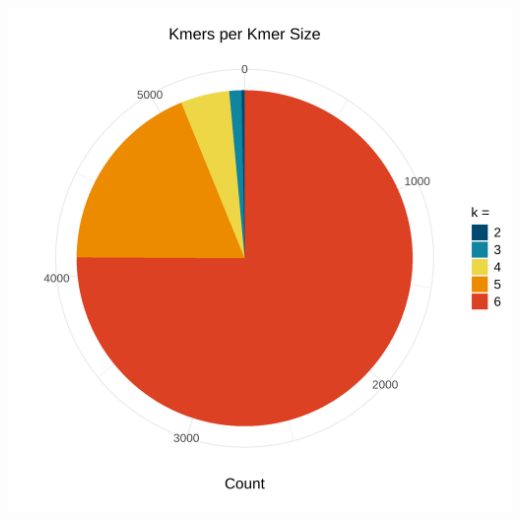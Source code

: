 \documentclass[
  letterpaper,
]{article}
\begin{document}
\begin{center}
\includegraphics{gb-test-pdf_files/figure-pdf/kmer-set-sizes-1.png}
\end{center}
\end{document}
